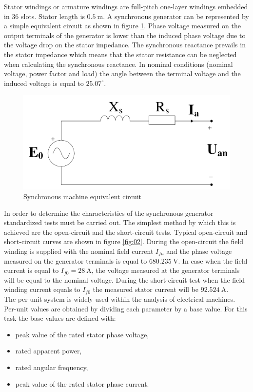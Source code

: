 \documentclass{article}
\begin{document}
Stator windings or armature windings are full-pitch one-layer windings embedded in 36 slots. Stator length is $0.5\ \mathrm{m}$. A synchronous generator can be represented by a simple equivalent circuit as shown in figure \ref{fig:01}. Phase voltage measured on the output terminals of the generator is lower than the induced phase voltage due to the voltage drop on the stator impedance. The synchronous reactance prevails in the stator impedance which means that the stator resistance can be neglected when calculating the synchronous reactance. In nominal conditions (nominal voltage, power factor and load) the angle between the terminal voltage and the induced voltage is equal to $25.07^{\circ}$.
\begin{figure}[!htb]
			\centering
			\includegraphics{Images/EquivalentCircuit.pdf}
			\caption{Synchronous machine equivalent circuit}
			\label{fig:01}
\end{figure}
In order to determine the characteristics of the synchronous generator standardized tests must be carried out. The simplest method by which this is achieved are the open-circuit and the short-circuit tests. Typical open-circuit and short-circuit curves are shown in figure \ref{fig:02}. During the open-circuit the field winding is supplied with the nominal field current $I_{fn}$ and the phase voltage measured on the generator terminals is equal to $680.235\ \mathrm{V}$. In case when the field current is equal to $I_{f0} = 28 \ \mathrm{A}$, the voltage measured at the generator terminals will be equal to the nominal voltage. During the short-circuit test when the field winding current equals to $I_{f0}$ the measured stator current will be $92.524\ \mathrm{A}$.
\\The per-unit system is widely used within the analysis of electrical machines. Per-unit values are obtained by dividing each parameter by a base value. For this task the base values are defined with:
\begin{itemize}
    \item peak value of the rated stator phase voltage,
    \item rated apparent power,
    \item rated angular frequency,
    \item peak value of the rated stator phase current.
\end{itemize}
\end{document}
